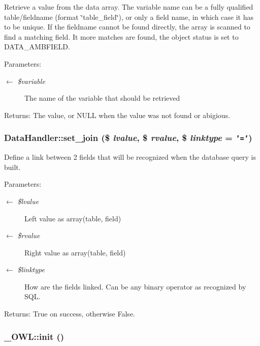 Retrieve a value from the data array. The variable name can be a fully qualified table/fieldname (format \char`\"{}table\_\-field\char`\"{}), or only a field name, in which case it has to be unique. If the fieldname cannot be found directly, the array is scanned to find a matching field. It more matches are found, the object status is set to DATA\_\-AMBFIELD.

\begin{Desc}
\item[Parameters:]
\begin{description}
\item[\mbox{$\leftarrow$} {\em \$variable}]The name of the variable that should be retrieved \end{description}
\end{Desc}
\begin{Desc}
\item[Returns:]The value, or NULL when the value was not found or abigious. \end{Desc}
\hypertarget{classDataHandler_9b77733f02e9d6281fc40df110c0ba70}{
\subsubsection{\setlength{\rightskip}{0pt plus 5cm}DataHandler::set\_\-join (\$ {\em lvalue}, \$ {\em rvalue}, \$ {\em linktype} = {\tt '='})}}
\label{classDataHandler_9b77733f02e9d6281fc40df110c0ba70}


Define a link between 2 fields that will be recognized when the database query is built.

\begin{Desc}
\item[Parameters:]
\begin{description}
\item[\mbox{$\leftarrow$} {\em \$lvalue}]Left value as array(table, field) \item[\mbox{$\leftarrow$} {\em \$rvalue}]Right value as array(table, field) \item[\mbox{$\leftarrow$} {\em \$linktype}]How are the fields linked. Can be any binary operator as recognized by SQL. \end{description}
\end{Desc}
\begin{Desc}
\item[Returns:]True on success, otherwise False. \end{Desc}
\hypertarget{class__OWL_e0ef3ded56e8a6b34b6461e5a721cd3e}{
\subsubsection{\setlength{\rightskip}{0pt plus 5cm}\_\-OWL::init ()}}
\label{class__OWL_e0ef3ded56e8a6b34b6461e5a721cd3e}



